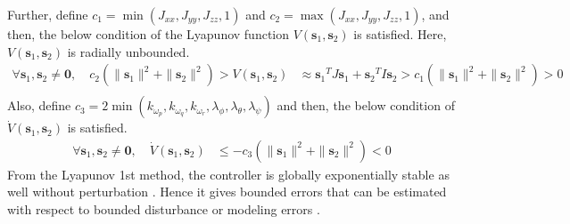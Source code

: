 Further, define \(c_1 =  \min(J_{xx}, J_{yy}, J_{zz}, 1) \) and \(c_2 =  \max(J_{xx}, J_{yy}, J_{zz}, 1) \), and then, the below condition of the Lyapunov function \({V} ({\boldsymbol s}_1, {\boldsymbol s}_2) \) is satisfied. Here, \({V} ({\boldsymbol s}_1, {\boldsymbol s}_2) \) is radially unbounded. \\
\begin{equation}
\begin{aligned}
\forall {\boldsymbol s}_1, {\boldsymbol s}_2 \neq {\boldsymbol 0}, \quad  c_2 (\|{{\boldsymbol s}_1}\|^2 +\|{{\boldsymbol s}_2}\|^2) > V({\boldsymbol s}_1, {\boldsymbol s}_2) & \approx  {{\boldsymbol s}_1}^{T} J {\boldsymbol s}_1 + {{\boldsymbol s}_2}^{T} I {\boldsymbol s}_2  >  c_1 (\|{{\boldsymbol s}_1}\|^2 +\|{{\boldsymbol s}_2}\|^2) > 0\\
\end{aligned}
\end{equation} 
Also, define \(c_3 = 2 \min(k_{\omega_p}, k_{\omega_q}, k_{\omega_r}, \lambda_{\phi}, \lambda_{\theta}, \lambda_{\psi}) \) and then, the below condition of \(\dot{V} ({\boldsymbol s}_1, {\boldsymbol s}_2) \) is satisfied.
\begin{equation}
\begin{aligned}
\forall {\boldsymbol s}_1, {\boldsymbol s}_2 \neq {\boldsymbol 0}, \quad \dot{V} ({\boldsymbol s}_1, {\boldsymbol s}_2) & \le - c_3 (\|{{\boldsymbol s}_1}\|^2 +\|{{\boldsymbol s}_2}\|^2) < 0
\end{aligned}
\end{equation} 
From the Lyapunov 1st method, the controller is globally exponentially stable as well without perturbation \cite{nonlinear_systems}. Hence it gives bounded errors that can be estimated with respect to bounded disturbance or modeling errors \cite{Bandyopadhyay16}.